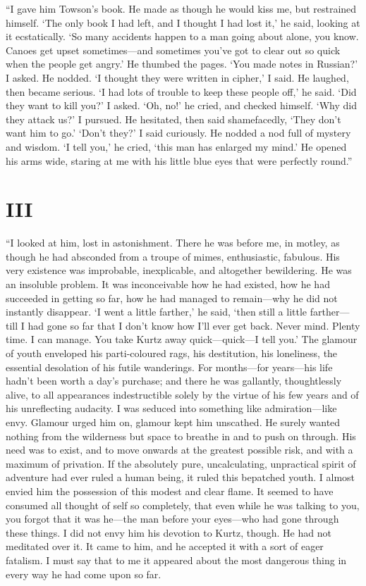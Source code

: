 \documentclass[12pt]{report}
\newcommand{\mychapter}[2]{
\setcounter{chapter}{#1}
    \setcounter{section}{0}
    \chapter*{#2}
    \addcontentsline{toc}{chapter}{#2}
}
\begin{document}
``I gave him Towson's book. He made as though he would kiss me, but
restrained himself. `The only book I had left, and I thought I had lost
it,' he said, looking at it ecstatically. `So many accidents happen to a
man going about alone, you know. Canoes get upset sometimes---and
sometimes you've got to clear out so quick when the people get angry.'
He thumbed the pages. `You made notes in Russian?' I asked. He nodded.
`I thought they were written in cipher,' I said. He laughed, then became
serious. `I had lots of trouble to keep these people off,' he said. `Did
they want to kill you?' I asked. `Oh, no!' he cried, and checked
himself. `Why did they attack us?' I pursued. He hesitated, then said
shamefacedly, `They don't want him to go.' `Don't they?' I said
curiously. He nodded a nod full of mystery and wisdom. `I tell you,' he
cried, `this man has enlarged my mind.' He opened his arms wide, staring
at me with his little blue eyes that were perfectly round.''

\mychapter{3}{III}\label{iii}

``I looked at him, lost in astonishment. There he was before me, in
motley, as though he had absconded from a troupe of mimes, enthusiastic,
fabulous. His very existence was improbable, inexplicable, and
altogether bewildering. He was an insoluble problem. It was
inconceivable how he had existed, how he had succeeded in getting so
far, how he had managed to remain---why he did not instantly disappear.
`I went a little farther,' he said, `then still a little farther---till
I had gone so far that I don't know how I'll ever get back. Never mind.
Plenty time. I can manage. You take Kurtz away quick---quick---I tell
you.' The glamour of youth enveloped his parti-coloured rags, his
destitution, his loneliness, the essential desolation of his futile
wanderings. For months---for years---his life hadn't been worth a day's
purchase; and there he was gallantly, thoughtlessly alive, to all
appearances indestructible solely by the virtue of his few years and of
his unreflecting audacity. I was seduced into something like
admiration---like envy. Glamour urged him on, glamour kept him
unscathed. He surely wanted nothing from the wilderness but space to
breathe in and to push on through. His need was to exist, and to move
onwards at the greatest possible risk, and with a maximum of privation.
If the absolutely pure, uncalculating, unpractical spirit of adventure
had ever ruled a human being, it ruled this bepatched youth. I almost
envied him the possession of this modest and clear flame. It seemed to
have consumed all thought of self so completely, that even while he was
talking to you, you forgot that it was he---the man before your
eyes---who had gone through these things. I did not envy him his
devotion to Kurtz, though. He had not meditated over it. It came to him,
and he accepted it with a sort of eager fatalism. I must say that to me
it appeared about the most dangerous thing in every way he had come upon
so far.
\end{document}
